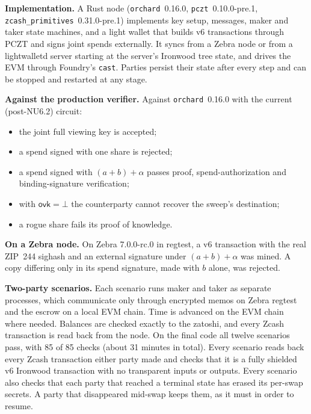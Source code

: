 \documentclass[10pt,letterpaper]{article}
\theoremstyle{plain}
\theoremstyle{definition}
\newcommand{\ovk}{\mathsf{ovk}}
\newcommand{\fn}[1]{\texttt{#1}}
\begin{document}
\textbf{Implementation.} A Rust node (\fn{orchard}~0.16.0, \fn{pczt}~0.10.0-pre.1,
\fn{zcash\_primitives}~0.31.0-pre.1) implements key setup, messages, maker and taker state
machines, and a light wallet that builds v6 transactions through PCZT and signs joint spends
externally. It syncs from a Zebra node or from a lightwalletd server starting at the server's
Ironwood tree state, and drives the EVM through Foundry's \fn{cast}. Parties persist their state
after every step and can be stopped and restarted at any stage.

\textbf{Against the production verifier.} Against \fn{orchard}~0.16.0 with the current (post-NU6.2) circuit:
\begin{itemize}\setlength\itemsep{0.05em}
\item the joint full viewing key is accepted;
\item a spend signed with one share is rejected;
\item a spend signed with $(a+b)+\alpha$ passes proof, spend-authorization and binding-signature
verification;
\item with $\ovk=\bot$ the counterparty cannot recover the sweep's destination;
\item a rogue share fails its proof of knowledge.
\end{itemize}

\textbf{On a Zebra node.} On Zebra 7.0.0-rc.0 in regtest, a v6 transaction with the real ZIP~244
sighash and an external signature under $(a+b)+\alpha$ was mined. A copy differing only in its
spend signature, made with $b$ alone, was rejected.

\textbf{Two-party scenarios.} Each scenario runs maker and taker as separate processes, which
communicate only through encrypted memos on Zebra regtest and the escrow on a local EVM chain.
Time is advanced on the EVM chain where needed. Balances are checked exactly to the zatoshi, and
every Zcash transaction is read back from the node. On the final code all twelve scenarios pass, with 85 of 85 checks (about 31 minutes in total). Every scenario reads back every Zcash transaction either party made and checks that it is a fully shielded v6 Ironwood transaction with no transparent inputs or outputs. Every scenario also checks that each party that reached a terminal state has erased its per-swap secrets. A party that disappeared mid-swap keeps them, as it must in order to resume.
\end{document}
